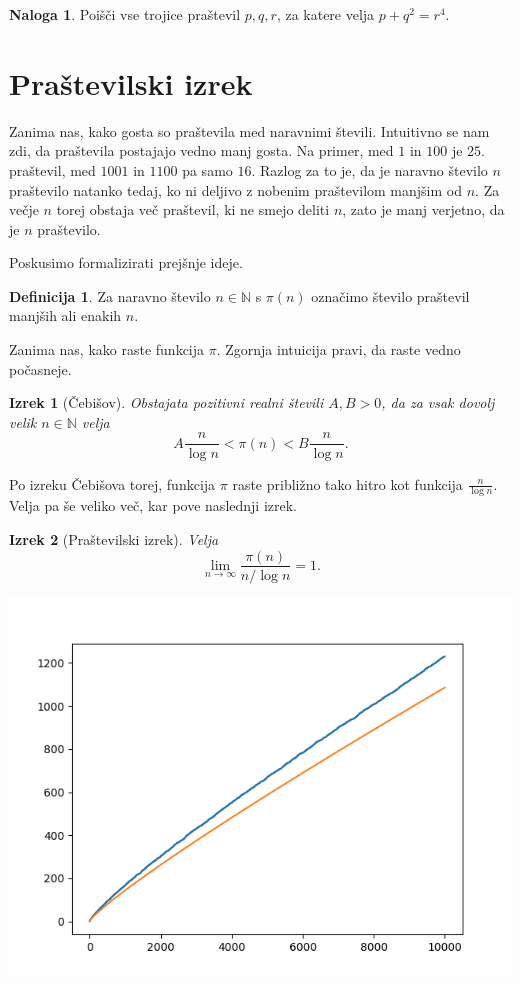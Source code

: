 \documentclass[a4paper,12pt]{article}
\def\N{\mathbb{N}}
\theoremstyle{definition}
\newtheorem{definicija}{Definicija}
\newtheorem{naloga}{Naloga}
\theoremstyle{plain}
\newtheorem{izrek}{Izrek}
\begin{document}
\begin{naloga}
    Poišči vse trojice praštevil $p, q, r$, za katere velja $p + q^2 = r^4$.
\end{naloga}



\section{Praštevilski izrek}
Zanima nas, kako gosta so praštevila med naravnimi števili. Intuitivno se nam zdi, da praštevila postajajo vedno manj gosta. Na primer, med $1$ in $100$ je $25$. praštevil, med $1001$ in $1100$ pa samo $16$. Razlog za to je, da je naravno število $n$ praštevilo natanko tedaj, ko ni deljivo z nobenim praštevilom manjšim od $n$. Za večje $n$ torej obstaja več praštevil, ki ne smejo deliti $n$, zato je manj verjetno, da je $n$ praštevilo.

Poskusimo formalizirati prejšnje ideje.
\begin{definicija}
    Za naravno število $n \in \N$ s $\pi(n)$ označimo število praštevil manjših ali enakih $n$.
\end{definicija}
Zanima nas, kako raste funkcija $\pi$. Zgornja intuicija pravi, da raste vedno počasneje.

\begin{izrek}[Čebišov]
    Obstajata pozitivni realni števili $A, B > 0$, da za vsak dovolj velik $n \in \N$ velja $$A\frac{n}{\log{n}} < \pi(n) < B\frac{n}{\log{n}}.$$
\end{izrek}

Po izreku Čebišova torej, funkcija $\pi$ raste približno tako hitro kot funkcija $\frac{n}{\log{n}}$. Velja pa še veliko več, kar pove naslednji izrek.

\begin{izrek}[Praštevilski izrek]
    Velja $$\lim_{n \rightarrow \infty} \frac{\pi(n)}{n / \log{n}} = 1.$$
\end{izrek}

\begin{center}
    \includegraphics[scale=0.8]{graf1.png}
\end{center}
\end{document}
